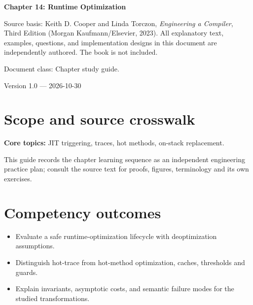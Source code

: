 \documentclass[10pt,letterpaper]{article}
\begin{document}
\begin{titlepage}
\centering\vspace*{1.0in}
{\Huge\bfseries\textcolor{CompilerBlue}{Chapter 14: Runtime Optimization}\par}
\vspace{.22in}{\Large Critical reading, original exercises, evidence and review\par}
\vspace{.4in}{\large Compiler Engineering Documentation Suite\par}
\vfill
\begin{minipage}{.86\linewidth}\small
Source basis: Keith D. Cooper and Linda Torczon, \emph{Engineering a Compiler}, Third Edition (Morgan Kaufmann/Elsevier, 2023). All explanatory text, examples, questions, and implementation designs in this document are independently authored. The book is not included.\par\medskip
Document class: Chapter study guide.
\end{minipage}
\vfill\textcolor{CompilerGray}{Version 1.0 --- 2026-10-30}\par
\end{titlepage}
\tableofcontents\clearpage
\section{Scope and source crosswalk}
\textbf{Core topics:} JIT triggering, traces, hot methods, on-stack replacement.

This guide records the chapter learning sequence as an independent engineering practice plan; consult the source text for proofs, figures, terminology and its own exercises.

\section{Competency outcomes}
\begin{itemize}
\item Evaluate a safe runtime-optimization lifecycle with deoptimization assumptions.
\item Distinguish hot-trace from hot-method optimization, caches, thresholds and guards.
\item Explain invariants, asymptotic costs, and semantic failure modes for the studied transformations.
\end{itemize}
\end{document}
